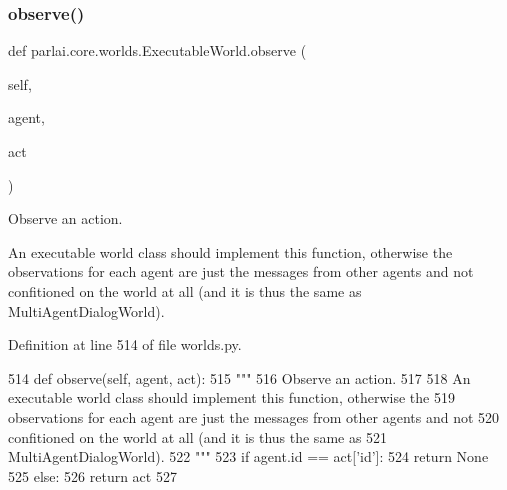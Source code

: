 \subsubsection{\texorpdfstring{observe()}{observe()}}
{\footnotesize\ttfamily def parlai.\+core.\+worlds.\+Executable\+World.\+observe (\begin{DoxyParamCaption}\item[{}]{self,  }\item[{}]{agent,  }\item[{}]{act }\end{DoxyParamCaption})}

\begin{DoxyVerb}Observe an action.

An executable world class should implement this function, otherwise the
observations for each agent are just the messages from other agents and not
confitioned on the world at all (and it is thus the same as
MultiAgentDialogWorld).
\end{DoxyVerb}
 

Definition at line 514 of file worlds.\+py.


\begin{DoxyCode}
514     \textcolor{keyword}{def }observe(self, agent, act):
515         \textcolor{stringliteral}{"""}
516 \textcolor{stringliteral}{        Observe an action.}
517 \textcolor{stringliteral}{}
518 \textcolor{stringliteral}{        An executable world class should implement this function, otherwise the}
519 \textcolor{stringliteral}{        observations for each agent are just the messages from other agents and not}
520 \textcolor{stringliteral}{        confitioned on the world at all (and it is thus the same as}
521 \textcolor{stringliteral}{        MultiAgentDialogWorld).}
522 \textcolor{stringliteral}{        """}
523         \textcolor{keywordflow}{if} agent.id == act[\textcolor{stringliteral}{'id'}]:
524             \textcolor{keywordflow}{return} \textcolor{keywordtype}{None}
525         \textcolor{keywordflow}{else}:
526             \textcolor{keywordflow}{return} act
527 
\end{DoxyCode}
\mbox{\label{classparlai_1_1core_1_1worlds_1_1ExecutableWorld_a6555592d2b7c316e72febc1fccf43bdb}} 
